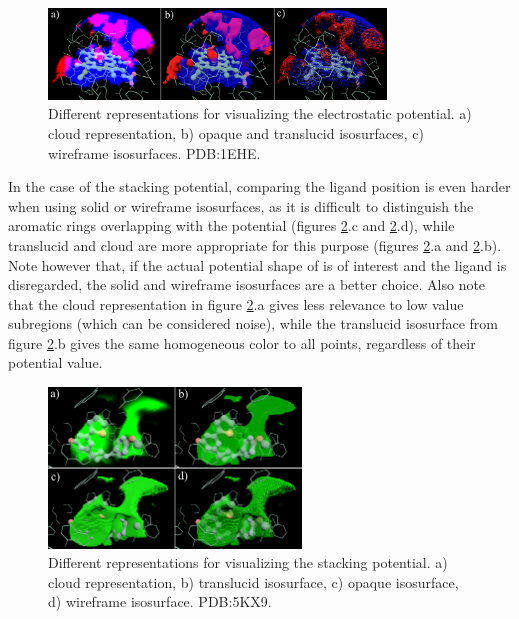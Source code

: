     \begin{figure}[H]
      \centering
      \includegraphics[width=0.8\textwidth]{figures/results/reprs_0.png}
      \caption{\label{fig:results/reprs_0} Different representations for visualizing the electrostatic potential. a) cloud representation, b) opaque and translucid isosurfaces, c) wireframe isosurfaces. PDB:1EHE.}
    \end{figure}

    In the case of the stacking potential, comparing the ligand position is even harder when using solid or wireframe isosurfaces, as it is difficult to distinguish the aromatic rings overlapping with the potential (figures \ref{fig:results/reprs_1}.c and \ref{fig:results/reprs_1}.d), while translucid and cloud are more appropriate for this purpose (figures \ref{fig:results/reprs_1}.a and \ref{fig:results/reprs_1}.b). Note however that, if the actual potential shape of is of interest and the ligand is disregarded, the solid and wireframe isosurfaces are a better choice. Also note that the cloud representation in figure \ref{fig:results/reprs_1}.a gives less relevance to low value subregions (which can be considered noise), while the translucid isosurface from figure \ref{fig:results/reprs_1}.b gives the same homogeneous color to all points, regardless of their potential value.

    \begin{figure}[H]
      \centering
      \includegraphics[width=0.6\textwidth]{figures/results/reprs_1.png}
      \caption{\label{fig:results/reprs_1} Different representations for visualizing the stacking potential. a) cloud representation, b) translucid isosurface, c) opaque isosurface, d) wireframe isosurface. PDB:5KX9.}
    \end{figure}

